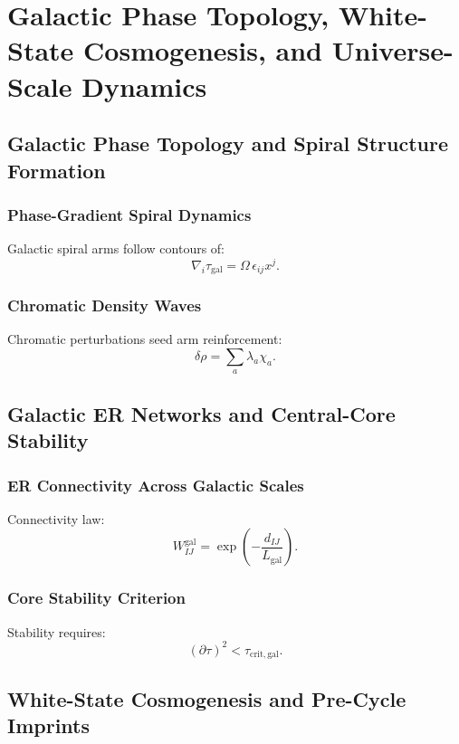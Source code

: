 

\part{Galactic Phase Topology, White-State Cosmogenesis, and Universe-Scale Dynamics}

\chapter{Galactic Phase Topology and Spiral Structure Formation}

\section{Phase-Gradient Spiral Dynamics}
Galactic spiral arms follow contours of:
\[
\nabla_i \tau_{\mathrm{gal}} = \Omega\, \epsilon_{ij} x^j.
\]

\section{Chromatic Density Waves}
Chromatic perturbations seed arm reinforcement:
\[
\delta\rho = \sum_a \lambda_a \chi_a.
\]

\chapter{Galactic ER Networks and Central-Core Stability}

\section{ER Connectivity Across Galactic Scales}
Connectivity law:
\[
W_{IJ}^{\mathrm{gal}} = \exp\!\left(-\frac{d_{IJ}}{L_{\mathrm{gal}}}\right).
\]

\section{Core Stability Criterion}
Stability requires:
\[
(\partial\tau)^2 < \tau_{\mathrm{crit,gal}}.
\]

\chapter{White-State Cosmogenesis and Pre-Cycle Imprints}

